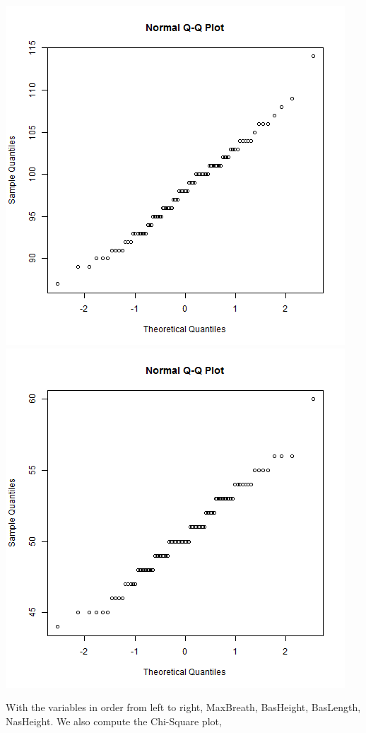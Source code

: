 \documentclass[letterpaper,10pt]{article}
\begin{document}
\begin{description}
\begin{center}
\includegraphics[scale=.25]{QQBasL.png}
\includegraphics[scale=.25]{QQNasH.png}
\end{center}
With the variables in order from left to right, MaxBreath, BasHeight, BasLength, NasHeight. We also compute the Chi-Square plot,
\begin{center}

\end{center}
\end{description}
\end{document}
